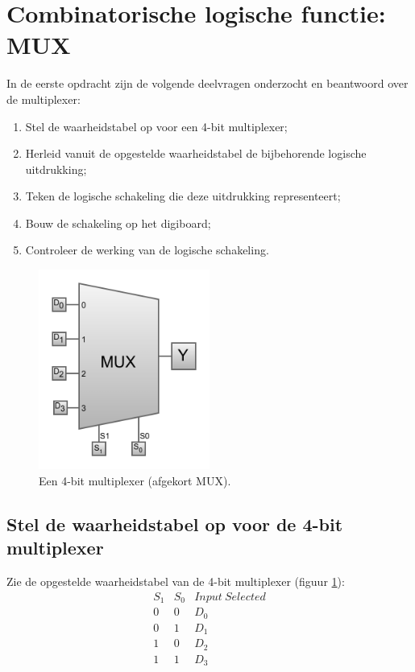 \documentclass[12pt]{article}
\begin{document}
\section{Combinatorische logische functie: MUX}
In de eerste opdracht zijn de volgende deelvragen onderzocht en beantwoord over de multiplexer:
\begin{enumerate}
    \item Stel de waarheidstabel op voor een 4-bit multiplexer;
    \item Herleid vanuit de opgestelde waarheidstabel de bijbehorende logische uitdrukking; 
    \item Teken de logische schakeling die deze uitdrukking representeert;
    \item Bouw de schakeling op het digiboard;
    \item Controleer de werking van de logische schakeling. 
\end{enumerate}
\begin{figure}[h]
    \centering
    \includegraphics[width=0.5\textwidth]{mux3.png}
    \caption{Een 4-bit multiplexer (afgekort MUX).}
    \label{fig:mux43}
\end{figure}
\pagebreak
\subsection{Stel de waarheidstabel op voor de 4-bit multiplexer}
Zie de opgestelde waarheidstabel van de 4-bit multiplexer (figuur \ref{fig:mux43}):
\begin{displaymath}
    \begin{array}{|c|c||c|}
    S_{1} & S_{0} & Input\ Selected \\
    \hline 
    0 & 0 & D_{0} \\
    0 & 1 & D_{1} \\
    1 & 0 & D_{2} \\
    1 & 1 & D_{3}
    \end{array}
    \end{displaymath}
\end{document}
